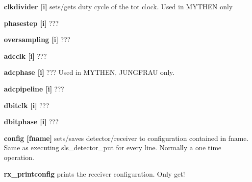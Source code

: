 \begin{DoxyItemize}
\item {\bfseries clkdivider \mbox{[}i\mbox{]}} sets/gets duty cycle of the tot clock. Used in MYTHEN only
\end{DoxyItemize}


\begin{DoxyItemize}
\item {\bfseries phasestep \mbox{[}i\mbox{]}} ???
\end{DoxyItemize}


\begin{DoxyItemize}
\item {\bfseries oversampling \mbox{[}i\mbox{]}} ???
\end{DoxyItemize}


\begin{DoxyItemize}
\item {\bfseries adcclk \mbox{[}i\mbox{]}} ???
\end{DoxyItemize}


\begin{DoxyItemize}
\item {\bfseries adcphase \mbox{[}i\mbox{]}} ??? Used in MYTHEN, JUNGFRAU only.
\end{DoxyItemize}


\begin{DoxyItemize}
\item {\bfseries adcpipeline \mbox{[}i\mbox{]}} ???
\end{DoxyItemize}


\begin{DoxyItemize}
\item {\bfseries dbitclk \mbox{[}i\mbox{]}} ???
\end{DoxyItemize}


\begin{DoxyItemize}
\item {\bfseries dbitphase \mbox{[}i\mbox{]}} ???
\end{DoxyItemize}


\begin{DoxyItemize}
\item {\bfseries config \mbox{[}fname\mbox{]}} sets/saves detector/receiver to configuration contained in fname. Same as executing sls\_\-detector\_\-put for every line. Normally a one time operation.
\end{DoxyItemize}


\begin{DoxyItemize}
\item {\bfseries rx\_\-printconfig} prints the receiver configuration. Only get!
\end{DoxyItemize}


